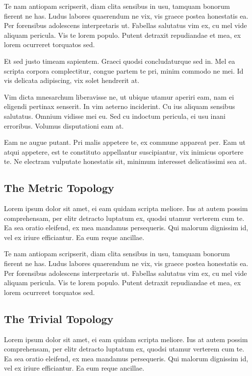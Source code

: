 \documentclass[12pt, a4paper]{article}
\theoremstyle{definition}
\theoremstyle{remark}
\numberwithin{equation}{section}
\numberwithin{figure}{section}
\numberwithin{table}{section}
\begin{document}
        Te nam antiopam scripserit, diam clita sensibus in usu, tamquam bonorum fierent ne has. Ludus labores quaerendum ne vix, vis graece postea honestatis ea. Per forensibus adolescens interpretaris ut. Fabellas salutatus vim ex, cu mel vide aliquam pericula. Vis te lorem populo. Putent detraxit repudiandae et mea, ex lorem ocurreret torquatos sed.

        Et sed justo timeam sapientem. Graeci quodsi concludaturque sed in. Mel ea scripta corpora complectitur, congue partem te pri, minim commodo ne mei. Id vis delicata adipiscing, vix solet hendrerit at.

        Vim dicta mnesarchum liberavisse ne, ut ubique utamur aperiri eam, nam ei eligendi pertinax senserit. In vim aeterno inciderint. Cu ius aliquam sensibus salutatus. Omnium vidisse mei eu. Sed cu indoctum pericula, ei usu inani erroribus. Volumus disputationi eam at.

        Eam ne augue putant. Pri malis appetere te, ex commune appareat per. Eam ut atqui appetere, est te constituto appellantur suscipiantur, vix inimicus oportere te. Ne electram vulputate honestatis sit, minimum interesset delicatissimi sea at.
        \subsection{The Metric Topology}
            Lorem ipsum dolor sit amet, ei eam quidam scripta meliore. Ius at autem possim comprehensam, per elitr detracto luptatum ex, quodsi utamur verterem cum te. Ea sea oratio eleifend, ex mea mandamus persequeris. Qui malorum dignissim id, vel ex iriure efficiantur. Ea eum reque ancillae.

            Te nam antiopam scripserit, diam clita sensibus in usu, tamquam bonorum fierent ne has. Ludus labores quaerendum ne vix, vis graece postea honestatis ea. Per forensibus adolescens interpretaris ut. Fabellas salutatus vim ex, cu mel vide aliquam pericula. Vis te lorem populo. Putent detraxit repudiandae et mea, ex lorem ocurreret torquatos sed.
        \subsection{The Trivial Topology}
            Lorem ipsum dolor sit amet, ei eam quidam scripta meliore. Ius at autem possim comprehensam, per elitr detracto luptatum ex, quodsi utamur verterem cum te. Ea sea oratio eleifend, ex mea mandamus persequeris. Qui malorum dignissim id, vel ex iriure efficiantur. Ea eum reque ancillae.
\end{document}
